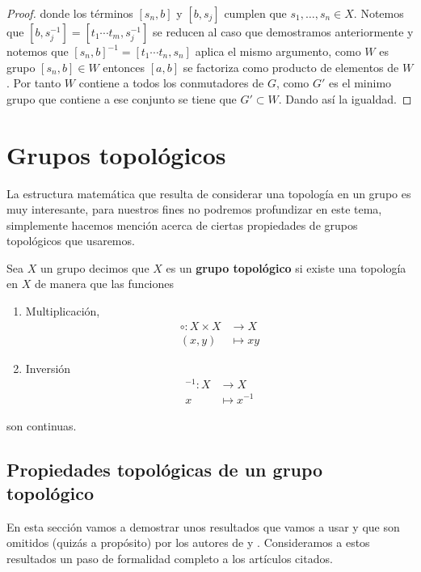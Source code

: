 \begin{proof}
 donde los términos $[s_n,b]$ y $[b,s_j]$ cumplen que $s_1, \dots , s_n \in X$. Notemos que $[b,s_j^{-1}]=[t_1 \cdots t_m,s_j^{-1}]$ se reducen al caso que demostramos anteriormente y notemos que $[s_n,b]^{-1}=[t_1 \cdots t_n,s_n]$ aplica el mismo argumento, como $W$ es grupo $[s_n,b]  \in W$  entonces $[a,b]$ se factoriza como producto de elementos de $W$. Por tanto $W$ contiene a todos los conmutadores de $G$, como $G'$ es el minimo grupo que contiene a ese conjunto se tiene que $G' \subset W.$ Dando así la igualdad.

\end{proof}


\section*{Grupos topológicos}
La estructura matemática que resulta  de considerar una topología en un grupo es muy interesante, para nuestros fines no podremos profundizar en este tema, simplemente hacemos mención acerca de ciertas propiedades de grupos topológicos que usaremos.  

\begin{df}
	Sea $X$ un grupo decimos que $X$ es un \textbf{grupo topológico} si existe una topología en $X$ de manera que las funciones 
	\begin{enumerate}
	\item  Multiplicación,
	\begin{align*}
	\circ : X \times X & \to X \\
	(x,y) & \mapsto xy
	\end{align*}
	
	\item Inversión
	\begin{align*}
	^{-1} : X & \to X \\
	x & \mapsto x^{-1}
	\end{align*}		
	 
	\end{enumerate}
son continuas.	
	\end{df}

 \subsection*{Propiedades topológicas de un grupo topológico}
En esta sección vamos a demostrar unos resultados que vamos  a usar y que son omitidos (quizás a propósito) por los autores de \cite{ander} y \cite{epst}. Consideramos a estos resultados un paso de formalidad completo a los artículos citados. 

